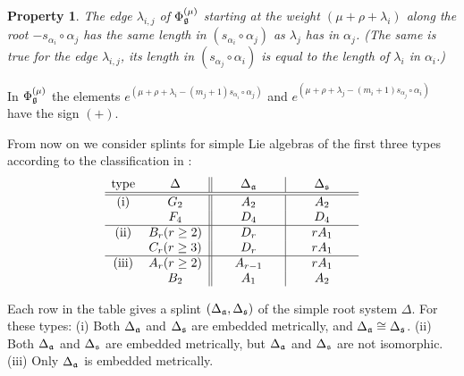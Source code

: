 \documentclass[12pt]{article}
\newtheorem{Prop}[Def]{Property}
\begin{document}
\begin{Prop}
 The edge $\lambda_{i,j}$ of $\Phi_{\frak{g}} ^{\left( \mu \right) }$ starting at the weight $\left( \mu + \rho + \lambda_i \right)$ along the root $- s_{\alpha_i}\circ \alpha_j$ has the same length in $( s_{\alpha_i}\circ \alpha_j )$ as $\lambda_j$ has in $\alpha_j$.
(The same is true for the edge $\lambda_{i,j}$, its length in $( s_{\alpha_j}\circ \alpha_i )$  is equal to the length of $\lambda_i$ in $\alpha_i$.)
\label{diagram property}
\end{Prop}
  In $\Phi_{\frak{g}} ^{\left( \mu \right) }$ the elements $e^{\left( \mu + \rho + \lambda_i -  (m_j + 1) s_{\alpha_i}\circ \alpha_j\right)}$ and  $e^{\left( \mu + \rho + \lambda_j -  (m_i + 1) s_{\alpha_j}\circ \alpha_i\right)}$
have the sign $(+)$.

From now on we consider splints for simple Lie algebras of the first three types according to the classification in \cite{richter2008splints}: 
$$\begin{array}{c c||c|c}
\hbox{type}
& \hspace{0.25 in}\Delta\hspace{0.25 in} & \hspace{0.25 in}\Delta_{\frak{a} }\hspace{0.25 in} & \hspace{0.25 in}\Delta _{\frak{s}}\hspace{0.25 in} \\
\hline
\hline
\hbox{(i)}     & G_2 & A_2 & A_2 \\
& F_4 & D_4 & D_4 \\
\hline
\hbox{(ii)} & B_r (r\geq 2) & D_r & rA_1 \\
    & C_r (r\geq 3) & D_r  & rA_1 \\
\hline
\hbox{(iii)}    & A_r (r\geq 2) & A_{r-1} & r A_1 \\
    & B_2 & A_1 & A_2 \\
\end{array}$$

Each row in the table gives a splint $(\Delta_{\frak{a} },\Delta_{\frak{s} })$ of the simple root system $\Delta$.
For these types:  
(i) Both $\Delta_{\frak{a} }$ and $\Delta_{\frak{s} }$ are embedded metrically, and $\Delta_{\frak{a} }\cong\Delta_{\frak{s} }$. 
(ii) Both $\Delta_{\frak{a} }$ and $\Delta_{\frak{s} }$ are embedded metrically, but $\Delta_{\frak{a} }$ and $\Delta_{\frak{s} }$ are not isomorphic.
(iii) Only $\Delta_{\frak{a} }$ is embedded metrically.
\end{document}
